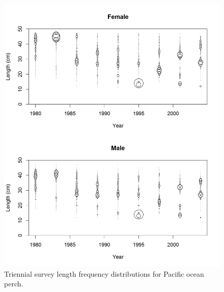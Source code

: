 \documentclass[12pt,]{article}
\begin{document}
\begin{figure}
\centering
\includegraphics{Figures/Triennial_Lengths.png}
\caption{Triennial survey length frequency distributions for Pacific
ocean perch. \label{fig:Tri_Length}}
\end{figure}
\end{document}

